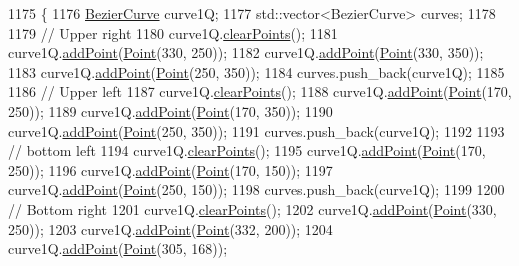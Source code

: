 \begin{DoxyCode}
1175                \{
1176     \mbox{\hyperlink{class_bezier_curve}{BezierCurve}} curve1Q;
1177     std::vector<BezierCurve> curves;
1178 
1179     \textcolor{comment}{// Upper right}
1180     curve1Q.\mbox{\hyperlink{class_bezier_curve_a0ba8ce66d5af5971ae6a1b506029728e}{clearPoints}}();
1181     curve1Q.\mbox{\hyperlink{class_bezier_curve_a38d16c18b36ae45619b05e26e226cf34}{addPoint}}(\mbox{\hyperlink{class_point}{Point}}(330, 250));
1182     curve1Q.\mbox{\hyperlink{class_bezier_curve_a38d16c18b36ae45619b05e26e226cf34}{addPoint}}(\mbox{\hyperlink{class_point}{Point}}(330, 350));
1183     curve1Q.\mbox{\hyperlink{class_bezier_curve_a38d16c18b36ae45619b05e26e226cf34}{addPoint}}(\mbox{\hyperlink{class_point}{Point}}(250, 350));
1184     curves.push\_back(curve1Q);
1185 
1186     \textcolor{comment}{// Upper left}
1187     curve1Q.\mbox{\hyperlink{class_bezier_curve_a0ba8ce66d5af5971ae6a1b506029728e}{clearPoints}}();
1188     curve1Q.\mbox{\hyperlink{class_bezier_curve_a38d16c18b36ae45619b05e26e226cf34}{addPoint}}(\mbox{\hyperlink{class_point}{Point}}(170, 250));
1189     curve1Q.\mbox{\hyperlink{class_bezier_curve_a38d16c18b36ae45619b05e26e226cf34}{addPoint}}(\mbox{\hyperlink{class_point}{Point}}(170, 350));
1190     curve1Q.\mbox{\hyperlink{class_bezier_curve_a38d16c18b36ae45619b05e26e226cf34}{addPoint}}(\mbox{\hyperlink{class_point}{Point}}(250, 350));
1191     curves.push\_back(curve1Q);
1192 
1193     \textcolor{comment}{// bottom left}
1194     curve1Q.\mbox{\hyperlink{class_bezier_curve_a0ba8ce66d5af5971ae6a1b506029728e}{clearPoints}}();
1195     curve1Q.\mbox{\hyperlink{class_bezier_curve_a38d16c18b36ae45619b05e26e226cf34}{addPoint}}(\mbox{\hyperlink{class_point}{Point}}(170, 250));
1196     curve1Q.\mbox{\hyperlink{class_bezier_curve_a38d16c18b36ae45619b05e26e226cf34}{addPoint}}(\mbox{\hyperlink{class_point}{Point}}(170, 150));
1197     curve1Q.\mbox{\hyperlink{class_bezier_curve_a38d16c18b36ae45619b05e26e226cf34}{addPoint}}(\mbox{\hyperlink{class_point}{Point}}(250, 150));
1198     curves.push\_back(curve1Q);
1199 
1200     \textcolor{comment}{// Bottom right}
1201     curve1Q.\mbox{\hyperlink{class_bezier_curve_a0ba8ce66d5af5971ae6a1b506029728e}{clearPoints}}();
1202     curve1Q.\mbox{\hyperlink{class_bezier_curve_a38d16c18b36ae45619b05e26e226cf34}{addPoint}}(\mbox{\hyperlink{class_point}{Point}}(330, 250));
1203     curve1Q.\mbox{\hyperlink{class_bezier_curve_a38d16c18b36ae45619b05e26e226cf34}{addPoint}}(\mbox{\hyperlink{class_point}{Point}}(332, 200));
1204     curve1Q.\mbox{\hyperlink{class_bezier_curve_a38d16c18b36ae45619b05e26e226cf34}{addPoint}}(\mbox{\hyperlink{class_point}{Point}}(305, 168));

\end{DoxyCode}
